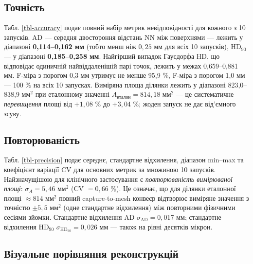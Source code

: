 \documentclass[
  ukrainian,
  10pt,
  a4paper,
  twocolumn]{article}
\begin{document}
\subsection{Точність}\label{ux442ux43eux447ux43dux456ux441ux442ux44c}

Табл. \ref{tbl-accuracy} подає повний набір метрик невідповідності для
кожного з 10 запусків. AD --- середня двостороння відстань NN між
поверхнями --- лежить у діапазоні \textbf{0,114--0,162 мм} (тобто менш
ніж \(0,25\) мм для всіх 10 запусків), HD\(_{90}\) --- у діапазоні
\textbf{0,185--0,258 мм}. Найгірший випадок Гаусдорфа HD, що відповідає
одиничній найвіддаленішій парі точок, лежить у межах 0,659--0,881 мм.
F-міра з порогом 0,3 мм утримує не менше 95,9 \%, F-міра з порогом 1,0
мм --- 100 \% на всіх 10 запусках. Виміряна площа ділянки лежить у
діапазоні 823,0--838,9 мм\(^2\) при еталонному значенні
\(A_{\text{еталон}} = 814,18\) мм\(^2\) --- це систематичне
\emph{перевищення} площі від \(+1,08\) \% до \(+3,04\) \%; жоден запуск
не дає від'ємного зсуву.

\subsection{Повторюваність}\label{ux43fux43eux432ux442ux43eux440ux44eux432ux430ux43dux456ux441ux442ux44c}

Табл. \ref{tbl-precision} подає середнє, стандартне відхилення, діапазон
min--max та коефіцієнт варіації CV для основних метрик за множиною 10
запусків. Найзначущішою для клінічного застосування є
\emph{повторюваність вимірюваної площі}: \(\sigma_A = 5,46\) мм\(^2\)
(CV \(= 0,66\) \%). Це означає, що для ділянки еталонної площі
\(\approx 814\) мм\(^2\) повний capture-to-mesh конвеєр відтворює
виміряне значення з точністю \(\pm 5,5\) мм\(^2\) (одне стандартне
відхилення) між повторними фізичними сесіями зйомки. Стандартне
відхилення AD \(\sigma_{\text{AD}} = 0,017\) мм; стандартне відхилення
HD\(_{90}\) \(\sigma_{\text{HD}_{90}} = 0,026\) мм --- також на рівні
десятків мікрон.

\subsection{Візуальне порівняння
реконструкцій}\label{ux432ux456ux437ux443ux430ux43bux44cux43dux435-ux43fux43eux440ux456ux432ux43dux44fux43dux43dux44f-ux440ux435ux43aux43eux43dux441ux442ux440ux443ux43aux446ux456ux439}
\end{document}
